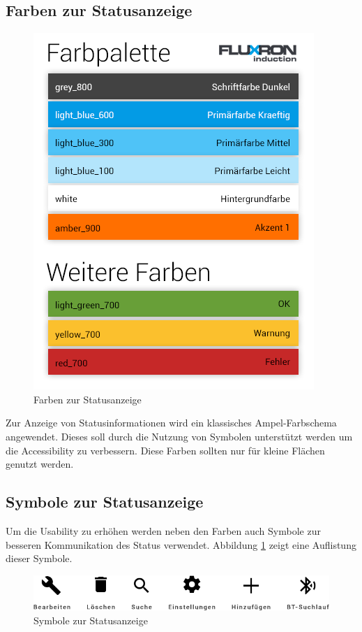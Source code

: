 \subsection{Farben zur Statusanzeige}
\label{subsec:Farben zur Statusanzeige}
\begin{figure}[H]
    \begin{center}
        \includegraphics[trim=0 0 0 370,clip,scale=0.7]{uiux/res/basic_colors}
    \end{center}
    \caption{Farben zur Statusanzeige}
\end{figure}
Zur Anzeige von Statusinformationen wird ein klassisches Ampel-Farbschema angewendet. Dieses soll durch die Nutzung von Symbolen unterstützt werden um die Accessibility zu verbessern. Diese Farben sollten nur für kleine Flächen genutzt werden.

\subsection{Symbole zur Statusanzeige}
\label{subsec:Symbole zur Statusanzeige}

Um die Usability zu erhöhen werden neben den Farben auch Symbole zur besseren Kommunikation des Status verwendet. Abbildung \ref{abb:statusSymbols} zeigt eine Auflistung dieser Symbole.

\vspace{0.5cm}

\begin{figure}[H]
    \begin{center}
        \includegraphics[scale=0.5]{uiux/res/icons}
    \end{center}
    \caption{Symbole zur Statusanzeige}
    \label{abb:statusSymbols}
\end{figure}
